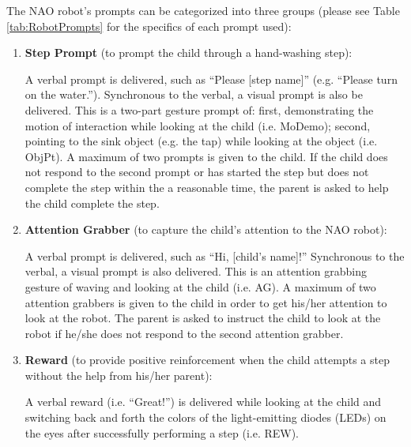 The NAO robot's prompts can be categorized into three groups (please see Table \ref{tab:RobotPrompts} for the specifics of each prompt used):
\begin{enumerate}
	\item \textbf{Step Prompt} (to prompt the child through a hand-washing step):
	
	A verbal prompt is delivered, such as “Please [step name]” (e.g. “Please turn on the water.”).  Synchronous to the verbal, a visual prompt is also be delivered. This is a two-part gesture prompt of: first, demonstrating the motion of interaction while looking at the child (i.e. MoDemo); second, pointing to the sink object (e.g. the tap) while looking at the object (i.e. ObjPt). A maximum of two prompts is given to the child. If the child does not respond to the second prompt or has started the step but does not complete the step within the a reasonable time, the parent is asked to help the child complete the step. 
	
	\item \textbf{Attention Grabber} (to capture the child's attention to the NAO robot): 
	
	A verbal prompt is delivered, such as “Hi, [child's name]!”  Synchronous to the verbal, a visual prompt is also delivered. This is an attention grabbing gesture of waving and looking at the child (i.e. AG). A maximum of two attention grabbers is given to the child in order to get his/her attention to look at the robot.  The parent is asked to instruct the child to look at the robot if he/she does not respond to the second attention grabber. 
	
	\item \textbf{Reward} (to provide positive reinforcement when the child attempts a step without the help from his/her parent): 
	
	A verbal reward (i.e. “Great!”) is delivered while looking at the child and switching back and forth the colors of the light-emitting diodes (LEDs) on the eyes after successfully performing a step (i.e. REW).
\end{enumerate}
